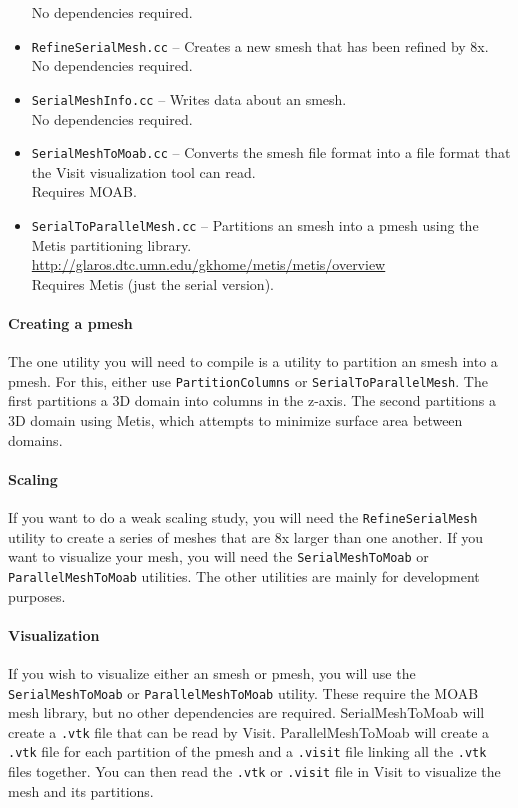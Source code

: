 \documentclass[12pt,letterpaper]{article}
\begin{document}
\begin{itemize}
{\color{red} No dependencies required.}
\item {\tt RefineSerialMesh.cc} -- Creates a new smesh that has been refined by 8x.\\
{\color{red} No dependencies required.}
\item {\tt SerialMeshInfo.cc} -- Writes data about an smesh.\\
{\color{red} No dependencies required.}
\item {\tt SerialMeshToMoab.cc} -- Converts the smesh file format into a file format that the Visit visualization tool can read.\\
{\color{red} Requires MOAB.}
\item {\tt SerialToParallelMesh.cc} -- Partitions an smesh into a pmesh using the Metis partitioning library.\\
\url{http://glaros.dtc.umn.edu/gkhome/metis/metis/overview} \\
{\color{red} Requires Metis (just the serial version).}
\end{itemize}


\paragraph{Creating a pmesh}
The one utility you will need to compile is a utility to partition an smesh into a pmesh.
For this, either use {\tt PartitionColumns} or {\tt SerialToParallelMesh}.
The first partitions a 3D domain into columns in the z-axis.
The second partitions a 3D domain using Metis, which attempts to minimize surface area between domains.


\paragraph{Scaling}
If you want to do a weak scaling study, you will need the {\tt RefineSerialMesh} utility to create a series of meshes that are 8x larger than one another.
If you want to visualize your mesh, you will need the {\tt SerialMeshToMoab} or {\tt ParallelMeshToMoab} utilities.
The other utilities are mainly for development purposes.


\paragraph{Visualization}
If you wish to visualize either an smesh or pmesh, you will use the {\tt SerialMeshToMoab} or {\tt ParallelMeshToMoab} utility.
These require the MOAB mesh library, but no other dependencies are required.
SerialMeshToMoab will create a {\tt .vtk} file that can be read by Visit.
ParallelMeshToMoab will create a {\tt .vtk} file for each partition of the pmesh and a {\tt .visit} file linking all the {\tt .vtk} files together.
You can then read the {\tt .vtk} or {\tt .visit} file in Visit to visualize the mesh and its partitions.
\end{document}
